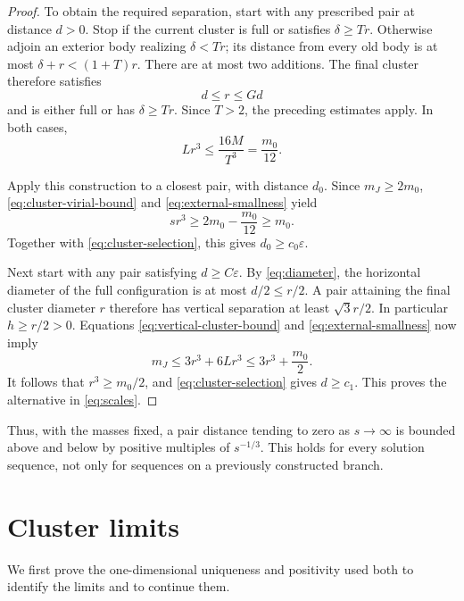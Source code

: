 \documentclass[11pt,a4paper]{amsart}
\numberwithin{equation}{section}
\newcommand{\eps}{\varepsilon}
\begin{document}
\begin{proof}
To obtain the required separation, start with any prescribed pair at
distance $d>0$. Stop if the current cluster is full or satisfies
$\delta\ge Tr$. Otherwise adjoin an exterior body realizing
$\delta<Tr$; its distance from every old body is at most
$\delta+r<(1+T)r$. There are at most two additions. The final cluster
therefore satisfies
\begin{equation}\label{eq:cluster-selection}
 d\le r\le Gd
\end{equation}
and is either full or has $\delta\ge Tr$. Since $T>2$, the preceding
estimates apply. In both cases,
\begin{equation}\label{eq:external-smallness}
 Lr^3\le\frac{16M}{T^3}=\frac{m_0}{12}.
\end{equation}

Apply this construction to a closest pair, with distance $d_0$.
Since $m_J\ge2m_0$, \eqref{eq:cluster-virial-bound} and
\eqref{eq:external-smallness} yield
\[
 sr^3\ge 2m_0-\frac{m_0}{12}\ge m_0.
\]
Together with \eqref{eq:cluster-selection}, this gives
$d_0\ge c_0\eps$.

Next start with any pair satisfying $d\ge C\eps$. By
\eqref{eq:diameter}, the horizontal diameter of the full configuration
is at most $d/2\le r/2$. A pair attaining the final cluster diameter
$r$ therefore has vertical separation at least $\sqrt3r/2$.
In particular $h\ge r/2>0$. Equations
\eqref{eq:vertical-cluster-bound} and \eqref{eq:external-smallness}
now imply
\[
 m_J\le3r^3+6Lr^3\le3r^3+\frac{m_0}{2}.
\]
It follows that $r^3\ge m_0/2$, and \eqref{eq:cluster-selection} gives
$d\ge c_1$. This proves the alternative in \eqref{eq:scales}.
\end{proof}

Thus, with the masses fixed, a pair distance tending to zero as
$s\to\infty$ is bounded above and below by positive multiples of
$s^{-1/3}$. This holds for every solution sequence, not only for sequences
on a previously constructed branch.

\section{Cluster limits}\label{sec:limits}

We first prove the one-dimensional uniqueness and positivity used
both to identify the limits and to continue them.
\end{document}
